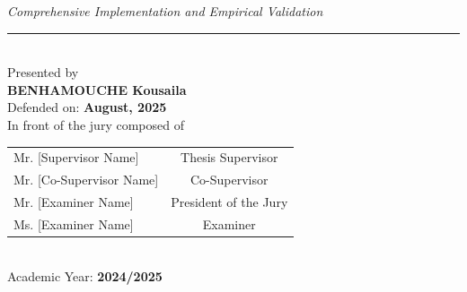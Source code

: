 \begin{center}
{\footnotesize \textit{Comprehensive Implementation and Empirical Validation}} \\[0.2cm]

\rule{13cm}{0.5pt} \\[0.3cm]

{\footnotesize Presented by} \\[0.1cm]
{\normalsize \textbf{BENHAMOUCHE Kousaila}} \\[0.2cm]

{\footnotesize Defended on: \textbf{August, 2025}} \\[0.1cm]
{\footnotesize In front of the jury composed of} \\[0.2cm]

{\footnotesize
\begin{tabular}{lc}
Mr. [Supervisor Name] & Thesis Supervisor \\
Mr. [Co-Supervisor Name] & Co-Supervisor \\
Mr. [Examiner Name] & President of the Jury \\
Ms. [Examiner Name] & Examiner \\
\end{tabular}} \\[0.3cm]

{\footnotesize Academic Year: \textbf{2024/2025}}

\end{center}

\restoregeometry
\newpage